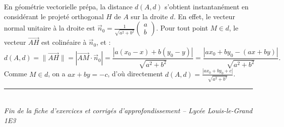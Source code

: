 \documentclass[11pt,a4paper]{article}
\newcommand{\vect}[1]{\overrightarrow{#1}}
\begin{document}
\begin{remarkbox}
En géométrie vectorielle prépa, la distance $d(A, d)$ s'obtient instantanément en considérant le projeté orthogonal $H$ de $A$ sur la droite $d$.
En effet, le vecteur normal unitaire à la droite est $\vec{n}_0 = \frac{1}{\sqrt{a^2+b^2}}\begin{pmatrix} a \\ b \end{pmatrix}$.
Pour tout point $M \in d$, le vecteur $\vect{AH}$ est colinéaire à $\vec{n}_0$, et :
\[
d(A, d) = \|\vect{AH}\| = |\vect{AM} \cdot \vec{n}_0| = \frac{|a(x_0 - x) + b(y_0 - y)|}{\sqrt{a^2+b^2}} = \frac{|ax_0 + by_0 - (ax + by)|}{\sqrt{a^2+b^2}}.
\]
Comme $M \in d$, on a $ax + by = -c$, d'où directement $d(A, d) = \frac{|ax_0 + by_0 + c|}{\sqrt{a^2+b^2}}$.
\end{remarkbox}

\vspace{1cm}
\begin{center}
    \rule{6cm}{0.5pt}\\[0.2cm]
    \small\textit{Fin de la fiche d'exercices et corrigés d'approfondissement -- Lycée Louis-le-Grand 1E3}
\end{center}
\end{document}

